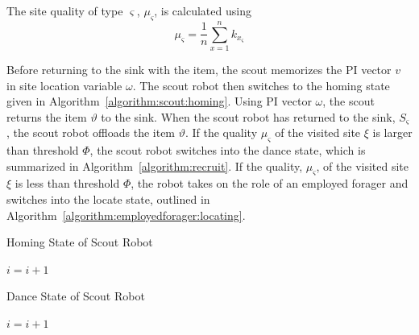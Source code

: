 The site quality of type $\varsigma$, $\mu_\varsigma$, is calculated using
\begin{equation}
\label{density}
\mu_\varsigma = \frac{1}{n}\sum\limits_{x=1}^n k_{x_\varsigma}
\end{equation}
 
Before returning to the sink with the item, the scout memorizes the PI vector $v$ in site location variable $\omega$. The scout robot then switches to the homing state given in Algorithm~\ref{algorithm:scout:homing}. Using PI vector $\omega$, the scout returns the item $\vartheta$ to the sink. When the scout robot has returned to the sink, $S_\varsigma$, the scout robot offloads the item $\vartheta$. If the quality $\mu_\varsigma$ of the visited site $\xi$ is larger than threshold $\Phi$, the scout robot switches into the dance state, which is summarized in Algorithm~\ref{algorithm:recruit}. If the quality, $\mu_\varsigma$, of the visited site $\xi$ is less than threshold $\Phi$, the robot takes on the role of an employed forager and switches into the locate state, outlined in Algorithm~\ref{algorithm:employedforager:locating}.


\begin{algorithm}
\caption{Homing State of Scout Robot}
\label{algorithm:scout:homing}
\begin{algorithmic}[1]
	\State {}
		\State {}
	\Else 
		\State {}
		\State {}
	\EndIf
\Else
		\State {}
	\EndIf
\EndIf
\State $i =i + 1$
\EndFunction
\end{algorithmic}
\end{algorithm}


\begin{algorithm}
\caption{Dance State of Scout Robot}
\label{algorithm:recruit}
\begin{algorithmic}[1]
	\State {} 
\Else 
	\State {}
	\If {$\varrho < \rho$} 
	\Else
	\EndIf
\EndIf
\State $i =i + 1$
\EndFunction
\end{algorithmic}
\end{algorithm}

